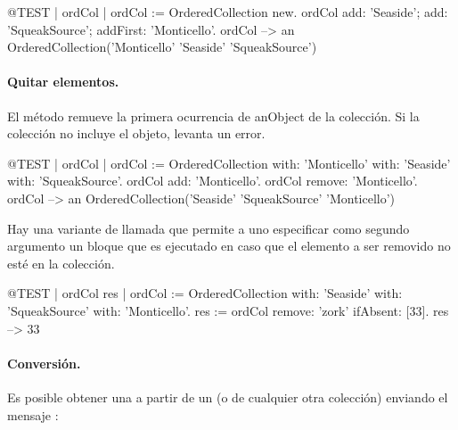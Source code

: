 \documentclass[a4paper,10pt,twoside]{book}
\begin{document}
\begin{code}{@TEST | ordCol |}
ordCol := OrderedCollection new.
ordCol add: 'Seaside'; add: 'SqueakSource'; addFirst: 'Monticello'.
ordCol --> an OrderedCollection('Monticello' 'Seaside' 'SqueakSource')
\end{code}

\paragraph{Quitar elementos.} El m\'etodo   remueve la primera ocurrencia de anObject de la colecci\'on. Si la colecci\'on no incluye el objeto, levanta un error. 

\begin{code}{@TEST | ordCol | ordCol := OrderedCollection with: 'Monticello' with: 'Seaside' with: 'SqueakSource'.}
ordCol add: 'Monticello'.
ordCol remove: 'Monticello'.
ordCol --> an OrderedCollection('Seaside' 'SqueakSource' 'Monticello')
\end{code}

Hay una variante de llamada  que permite a uno especificar como segundo argumento un bloque que es ejecutado en caso que el elemento a ser removido no est\'e en la colecci\'on. 

\begin{code}{@TEST | ordCol res | ordCol := OrderedCollection with: 'Seaside' with: 'SqueakSource' with: 'Monticello'.}
res := ordCol remove: 'zork' ifAbsent: [33].
res --> 33
\end{code}

\paragraph{Conversi\'on.}
Es posible obtener una  a partir de un  (o de cualquier otra colecci\'on) enviando el mensaje :


\end{document}
